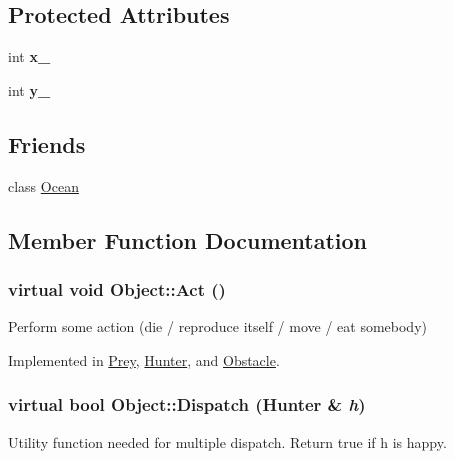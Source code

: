 \subsection*{Protected Attributes}
\begin{DoxyCompactItemize}
\item 
\hypertarget{classObject_ad0753c1468d66d4d88098f06ae2a29bb}{
int {\bfseries x\_\-}}
\label{classObject_ad0753c1468d66d4d88098f06ae2a29bb}

\item 
\hypertarget{classObject_a5fabb6445aafed3402a9431db73a8eb0}{
int {\bfseries y\_\-}}
\label{classObject_a5fabb6445aafed3402a9431db73a8eb0}

\end{DoxyCompactItemize}
\subsection*{Friends}
\begin{DoxyCompactItemize}
\item 
\hypertarget{classObject_afe3874c2dc8ab0fb894a9f3c80bfa1ad}{
class \hyperlink{classObject_afe3874c2dc8ab0fb894a9f3c80bfa1ad}{Ocean}}
\label{classObject_afe3874c2dc8ab0fb894a9f3c80bfa1ad}

\end{DoxyCompactItemize}


\subsection{Member Function Documentation}
\hypertarget{classObject_a683b351ee47dc69c4117cb9017c467d6}{
\subsubsection[{Act}]{\setlength{\rightskip}{0pt plus 5cm}virtual void Object::Act ()}}
\label{classObject_a683b351ee47dc69c4117cb9017c467d6}
Perform some action (die / reproduce itself / move / eat somebody) 

Implemented in \hyperlink{classPrey_a940c0a8879376b15dedb7debf9b8f1c8}{Prey}, \hyperlink{classHunter_ac8bed4eeb2bfebcf7df72ba7359ac204}{Hunter}, and \hyperlink{classObstacle_a4e1f98a918838ca96638e7536e3748cb}{Obstacle}.

\hypertarget{classObject_a0d0e1f0456837f6736913b1ba374f11d}{
\subsubsection[{Dispatch}]{\setlength{\rightskip}{0pt plus 5cm}virtual bool Object::Dispatch ({\bf Hunter} \& {\em h})}}
\label{classObject_a0d0e1f0456837f6736913b1ba374f11d}
Utility function needed for multiple dispatch. Return true if h is happy. 

